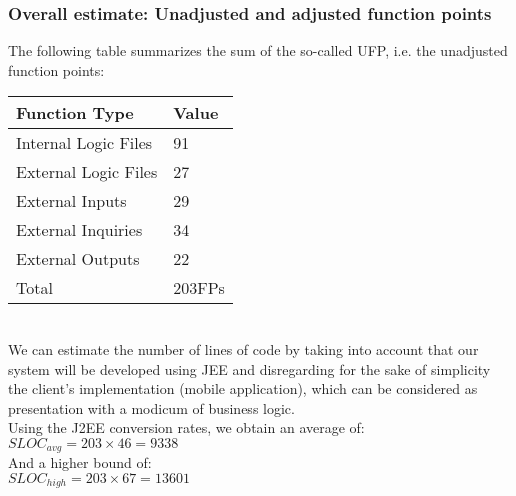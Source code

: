 \subsubsection{Overall estimate: Unadjusted and adjusted function points}
The following table summarizes the sum of the so-called UFP, i.e. the unadjusted function points:\\

	\begin{tabular}{|l|l|}
		\hline
		\textbf{Function Type} & \textbf{Value}\\ \hline
		Internal Logic Files & 91\\
		External Logic Files & 27\\
		External Inputs & 29\\
		External Inquiries & 34\\
		External Outputs & 22\\ \hline
		Total & 203FPs\\ \hline
	\end{tabular}\\
	
We can estimate the number of lines of code by taking into account that our system will be developed using JEE and disregarding for the sake of simplicity the client's implementation (mobile application), which can be considered as presentation with a modicum of business logic. \\
Using the J2EE conversion rates, we obtain an average of: \\

$SLOC_{avg} = 203 \times 46 = 9338$\\

And a higher bound of:\\

$SLOC_{high} = 203 \times 67 = 13601$